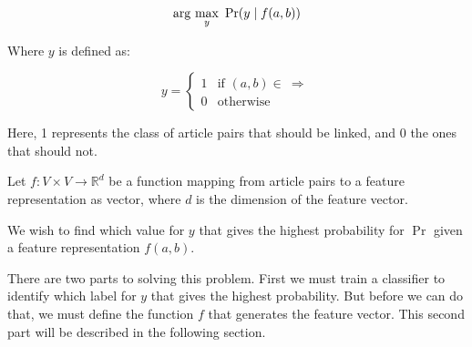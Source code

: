 \begin{equation}
\label{objective}
\arg\ \!\max_y\ \Pr(y \mid f(a,b)) 
\end{equation}

Where $y$ is defined as:

\[
    y=
\begin{cases}
    1 & \text{if } (a,b) \in \  \Rightarrow\\
    0 & \text{otherwise}
\end{cases}
\]

Here, 1 represents the class of article pairs that should be linked, and 0 the ones that should not.

Let $f: V\times V \to \mathbb{R}^d$ be a function mapping from article pairs to a feature representation as vector, where $d$ is the dimension of the feature vector.

We wish to find which value for $y$ that gives the highest probability for $\Pr$ given a feature representation $f(a,b)$.


There are two parts to solving this problem. First we must train a classifier to identify which label for $y$ that gives the highest probability. But before we can do that, we must define the function $f$ that generates the feature vector. This second part will be described in the following section.

%
%
%


